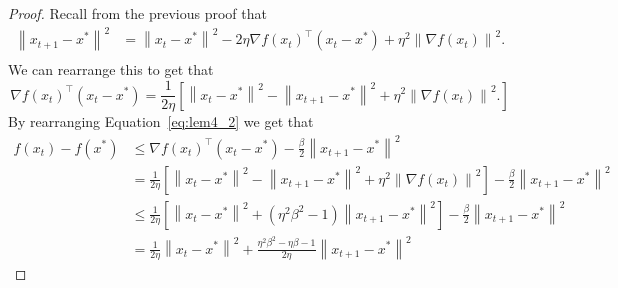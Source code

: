 \documentclass{article}
\newcommand{\norm}[1]{\left\| #1 \right\| }
\theoremstyle{definition}
\begin{document}
\begin{proof}
    Recall from the previous proof that
    \begin{equation}
        \begin{aligned}
            \norm{x_{t + 1} - x^*}^2 &= \norm{x_t - x^*}^2 - 2\eta {\nabla
            f(x_t)}^\intercal (x_t - x^*) + \eta^2 \norm{\nabla f(x_t)}^2. \\
        \end{aligned}
    \end{equation}
    We can rearrange this to get that 
    \begin{equation}
        {\nabla f(x_t)}^\intercal (x_t - x^*) = \frac{1}{2 \eta} \left[ \norm{x_t -
        x^*}^2 - \norm{x_{t + 1} -
        x^*}^2 + \eta^2 \norm{\nabla f(x_t)}^2.
        \right]
    \end{equation}
    By rearranging Equation~\ref{eq:lem4_2} we get that 
    \begin{equation}
        \begin{aligned}
            f(x_{t}) - f(x^*) &\leq {\nabla f(x_t)}^\intercal (x_t - x^*) -
\frac{\beta}{2} \norm{x_{t + 1} - x^*}^2
            \\ &= \frac{1}{2 \eta} \left[ \norm{x_t -
        x^*}^2 - \norm{x_{t + 1} -
        x^*}^2 + \eta^2 \norm{\nabla f(x_t)}^2 \right] -
        \frac{\beta}{2} \norm{x_{t + 1} - x^*}^2
            \\ &\leq \frac{1}{2 \eta} \left[ \norm{x_t -
            x^*}^2 + (\eta^2\beta^2 - 1) \norm{x_{t + 1} -
        x^*}^2 \right] -
        \frac{\beta}{2} \norm{x_{t + 1} - x^*}^2
            \\ &= \frac{1}{2 \eta} \norm{x_t -
            x^*}^2+ \frac{\eta^2\beta^2  - \eta\beta - 1}{2\eta}\norm{x_{t + 1} -
        x^*}^2 
        \end{aligned}
    \end{equation}
\end{proof}



\end{document}
